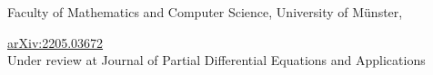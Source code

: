 \small{Faculty of Mathematics and Computer Science, University of M{\"u}nster,}
\smallskip

\begin{center}
  \href{https://arxiv.org/abs/2205.03672}{arXiv:2205.03672}\\
  Under review at Journal of Partial Differential Equations and Applications
\end{center}

\clearpage


